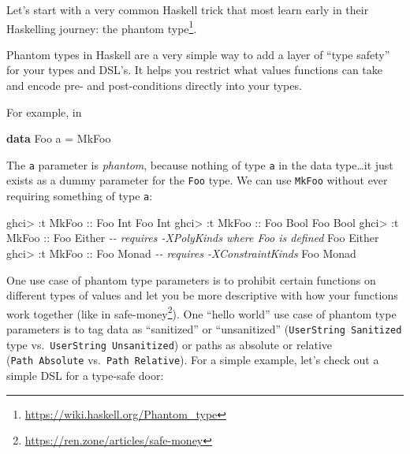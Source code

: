 \documentclass[]{article}
\newenvironment{Shaded}{}{}
\newcommand{\CommentTok}[1]{\textcolor[rgb]{0.38,0.63,0.69}{\textit{#1}}}
\newcommand{\DataTypeTok}[1]{\textcolor[rgb]{0.56,0.13,0.00}{#1}}
\newcommand{\KeywordTok}[1]{\textcolor[rgb]{0.00,0.44,0.13}{\textbf{#1}}}
\newcommand{\NormalTok}[1]{#1}
\newcommand{\OperatorTok}[1]{\textcolor[rgb]{0.40,0.40,0.40}{#1}}
\newcommand{\OtherTok}[1]{\textcolor[rgb]{0.00,0.44,0.13}{#1}}
\renewcommand{\href}[2]{#2\footnote{\url{#1}}}
\begin{document}
Let's start with a very common Haskell trick that most learn early in their
Haskelling journey: the \href{https://wiki.haskell.org/Phantom_type}{phantom
type}.

Phantom types in Haskell are a very simple way to add a layer of ``type safety''
for your types and DSL's. It helps you restrict what values functions can take
and encode pre- and post-conditions directly into your types.

For example, in

\begin{Shaded}
\begin{Highlighting}[]
\KeywordTok{data} \DataTypeTok{Foo}\NormalTok{ a }\OtherTok{=} \DataTypeTok{MkFoo}
\end{Highlighting}
\end{Shaded}

The \texttt{a} parameter is \emph{phantom}, because nothing of type \texttt{a}
in the data type\ldots it just exists as a dummy parameter for the \texttt{Foo}
type. We can use \texttt{MkFoo} without ever requiring something of type
\texttt{a}:

\begin{Shaded}
\begin{Highlighting}[]
\NormalTok{ghci}\OperatorTok{\textgreater{}} \OperatorTok{:}\NormalTok{t }\DataTypeTok{MkFoo}\OtherTok{ ::} \DataTypeTok{Foo} \DataTypeTok{Int}
\DataTypeTok{Foo} \DataTypeTok{Int}
\NormalTok{ghci}\OperatorTok{\textgreater{}} \OperatorTok{:}\NormalTok{t }\DataTypeTok{MkFoo}\OtherTok{ ::} \DataTypeTok{Foo} \DataTypeTok{Bool}
\DataTypeTok{Foo} \DataTypeTok{Bool}
\NormalTok{ghci}\OperatorTok{\textgreater{}} \OperatorTok{:}\NormalTok{t }\DataTypeTok{MkFoo}\OtherTok{ ::} \DataTypeTok{Foo} \DataTypeTok{Either}      \CommentTok{{-}{-} requires {-}XPolyKinds where \textquotesingle{}Foo\textquotesingle{} is defined}
\DataTypeTok{Foo} \DataTypeTok{Either}
\NormalTok{ghci}\OperatorTok{\textgreater{}} \OperatorTok{:}\NormalTok{t }\DataTypeTok{MkFoo}\OtherTok{ ::} \DataTypeTok{Foo} \DataTypeTok{Monad}       \CommentTok{{-}{-} requires {-}XConstraintKinds}
\DataTypeTok{Foo} \DataTypeTok{Monad}
\end{Highlighting}
\end{Shaded}

One use case of phantom type parameters is to prohibit certain functions on
different types of values and let you be more descriptive with how your
functions work together (like in
\href{https://ren.zone/articles/safe-money}{safe-money}). One ``hello world''
use case of phantom type parameters is to tag data as ``sanitized'' or
``unsanitized'' (\texttt{UserString\ \textquotesingle{}Sanitized} type
vs.~\texttt{UserString\ \textquotesingle{}Unsanitized}) or paths as absolute or
relative (\texttt{Path\ \textquotesingle{}Absolute}
vs.~\texttt{Path\ \textquotesingle{}Relative}). For a simple example, let's
check out a simple DSL for a type-safe door:
\end{document}
